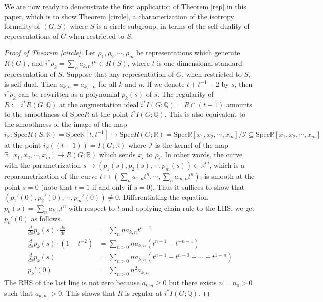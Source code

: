 \documentclass[11pt]{amsart}
\theoremstyle{plain}
\newtheorem{lemma}[theorem]{Lemma}
\theoremstyle{definition}
\begin{document}

We are now ready to demonstrate the first application of Theorem \ref{rep} in this paper, which is to show Theorem \ref{circle}, a characterization of the isotropy formality of $(G, S)$ where $S$ is a circle subgroup, in terms of the self-duality of representations of $G$ when restricted to $S$.
\begin{proof}[Proof of Theorem \ref{circle}] Let $\rho_1, \rho_2, \cdots, \rho_m$ be representations which generate $R(G)$, and $\displaystyle i^*\rho_k=\sum_{n}a_{k, n}t^n\in R(S)$, where $t$ is one-dimensional standard representation of $S$. Suppose that any representation of $G$, when restricted to $S$, is self-dual. Then $a_{k, n}=a_{k, -n}$ for all $k$ and $n$. If we denote $t+t^{-1}-2$ by $s$, then $i^*\rho_k$ can be rewritten as a polynomial $p_k(s)$ of $s$. The regularity of $R:=i^*R(G; \mathbb{Q})$ at the augmentation ideal $i^*I(G; \mathbb{Q})=R\cap (t-1)$ amounts to the smoothness of $\text{Spec} R$ at the point $i^*I(G; \mathbb{Q})$. This is also equivalent to the smoothness of the image of the map $i_\mathbb{R}: \text{Spec} R(S; \mathbb{R})=\text{Spec}\mathbb{R}[t, t^{-1}]\to \text{Spec} R(G; \mathbb{R})=\text{Spec}\mathbb{R}[x_1, x_2, \cdots, x_{m}]/\mathcal{I}\subseteq\text{Spec}\mathbb{R}[x_1, x_2, \cdots, x_m]$ at the point $i_\mathbb{R}((t-1))=I(G; \mathbb{R})$ where $\mathcal{I}$ is the kernel of the map $\mathbb{R}[x_1, x_2, \cdots, x_m]\to R(G; \mathbb{R})$ which sends $x_i$ to $\rho_i$. In other words, the curve with the parametrization $s\mapsto (p_1(s), p_2(s), \cdots, p_m(s))\in\mathbb{R}^m$, which is a reparametrization of the curve $\displaystyle t\mapsto \left(\sum_n a_{1, n}t^n, \cdots, \sum_n a_{m, n}t^n\right)$, is smooth at the point $s=0$ (note that $t=1$ if and only if $s=0$). Thus it suffices to show that $(p_1'(0), p_2'(0), \cdots, p_m'(0))\neq 0$. Differentiating the equation $\displaystyle p_k(s)=\sum_n a_{k, n}t^n$ with respect to $t$ and applying chain rule to the LHS, we get $p_k'(0)$ as follows.
\begin{align*}
	\frac{d}{ds}p_k(s)\cdot\frac{ds}{dt}&=\sum_n na_{k, n}t^{n-1}\\
	\frac{d}{ds}p_k(s)\cdot (1-t^{-2})&=\sum_{n>0}na_{k, n}(t^{n-1}-t^{-n-1})\\
	\frac{d}{ds}p_k(s)&=\sum_{n>0}na_{k, n}(t^{n-1}+t^{n-3}+\cdots+t^{1-n})\\
	p_k'(0)&=\sum_{n>0}n^2a_{k, n}
\end{align*}
The RHS of the last line is not zero because $a_{k, n}\geq 0$ but there exists $n=n_0>0$ such that $a_{k, n_0}>0$. This shows that $R$ is regular at $i^*I(G; \mathbb{Q})$. 


\end{proof}
\end{document}
